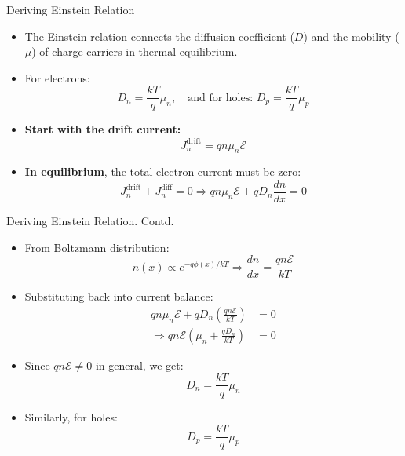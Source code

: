 \begin{frame}{Deriving Einstein Relation}
    \begin{itemize}
        \item The Einstein relation connects the diffusion coefficient ($D$) and the mobility ($\mu$) of charge carriers in thermal equilibrium.
        \item For electrons:
        \begin{equation}
        D_n = \frac{kT}{q} \mu_n, \quad \text{and for holes: } D_p = \frac{kT}{q} \mu_p
        \end{equation}
        \item \textbf{Start with the drift current:} 
        \begin{equation}
        J_n^{\text{drift}} = q n \mu_n \mathcal{E}
        \end{equation}
        \item \textbf{In equilibrium}, the total electron current must be zero:
        \begin{equation}
        J_n^{\text{drift}} + J_n^{\text{diff}} = 0
        \Rightarrow q n \mu_n \mathcal{E} + q D_n \frac{dn}{dx} = 0
        \end{equation}
    \end{itemize}
\end{frame}

\begin{frame}{Deriving Einstein Relation. Contd.}
    \begin{itemize}
        \item From Boltzmann distribution:
        \begin{equation}
        n(x) \propto e^{-q\phi(x)/kT} \Rightarrow \frac{dn}{dx} = \frac{q n \mathcal{E}}{kT}
        \end{equation}
        \item Substituting back into current balance:
        \begin{align*}
        q n \mu_n \mathcal{E} + q D_n \left( \frac{q n \mathcal{E}}{kT} \right) &= 0 \\
        \Rightarrow q n \mathcal{E} \left( \mu_n + \frac{q D_n}{kT} \right) &= 0
        \end{align*}
        \item Since $q n \mathcal{E} \neq 0$ in general, we get:
        \begin{equation}
        D_n = \frac{kT}{q} \mu_n
        \end{equation}
        \item Similarly, for holes:
        \begin{equation}
        D_p = \frac{kT}{q} \mu_p
        \end{equation}
    \end{itemize}
\end{frame}

